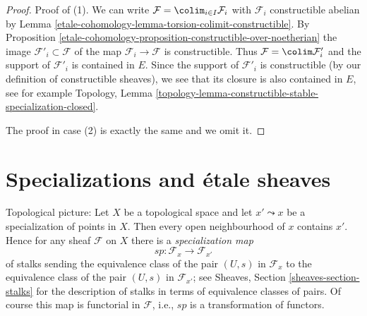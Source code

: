 \begin{proof}
Proof of (1). We can write $\mathcal{F} = \colim_{i \in I} \mathcal{F}_i$
with $\mathcal{F}_i$ constructible abelian by
Lemma \ref{etale-cohomology-lemma-torsion-colimit-constructible}.
By Proposition \ref{etale-cohomology-proposition-constructible-over-noetherian}
the image $\mathcal{F}'_i \subset \mathcal{F}$
of the map $\mathcal{F}_i \to \mathcal{F}$ is constructible.
Thus $\mathcal{F} = \colim \mathcal{F}'_i$ and the support
of $\mathcal{F}'_i$ is contained in $E$.
Since the support of $\mathcal{F}'_i$ is constructible
(by our definition of constructible sheaves), we see
that its closure is also contained in $E$, see for example
Topology, Lemma
\ref{topology-lemma-constructible-stable-specialization-closed}.

\medskip\noindent
The proof in case (2) is exactly the same and we omit it.
\end{proof}

\section{Specializations and \'etale sheaves}
\label{etale-cohomology-section-specialization}
Topological picture: Let $X$ be a topological space and let $x' \leadsto x$
be a specialization of points in $X$. Then every open neighbourhood of $x$
contains $x'$. Hence for any sheaf $\mathcal{F}$ on $X$ there is a
{\it specialization map}
$$
sp : \mathcal{F}_x \longrightarrow \mathcal{F}_{x'}
$$
of stalks sending the equivalence class of the pair $(U, s)$ in
$\mathcal{F}_x$ to the equivalence class of the pair $(U, s)$ in
$\mathcal{F}_{x'}$; see Sheaves, Section \ref{sheaves-section-stalks}
for the description of stalks in terms of equivalence classes of pairs.
Of course this map is functorial in $\mathcal{F}$, i.e., $sp$
is a transformation of functors.

